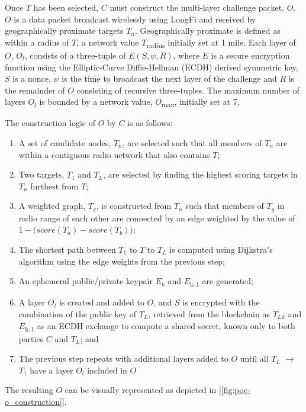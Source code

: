 \documentclass[10pt, nonatbib, nocopyrightspace, reprint]{sigplanconf}
\newcommand{\figref}[1]{[\autoref{#1}]}
\begin{document}
Once $T$ has been selected, $C$ must construct the multi-layer challenge packet, $O$. $O$ is a data packet broadcast wirelessly using LongFi and received by geographically proximate targets $T_n$. Geographically proximate is defined as within a radius of $T$, a network value $T$\textsubscript{radius} initially set at 1 mile. Each layer of $O$, $O_l$, consists of a three-tuple of $E\left(S, \psi, R\right)$, where $E$ is a secure encryption function using the Elliptic-Curve Diffie-Hellman (ECDH) derived symmetric key, $S$ is a nonce, $\psi$ is the time to broadcast the next layer of the challenge and $R$ is the remainder of $O$ consisting of recursive three-tuples. The maximum number of layers $O_l$ is bounded by a network value, $O$\textsubscript{max}, initially set at 7.

The construction logic of $O$ by $C$ is as follows:

\begin{enumerate}
  \item A set of candidate nodes, $T_n$, are selected such that all members of $T_n$ are within a contiguous radio network that also contains $T$;
  \item Two targets, $T_1$ and $T_L$, are selected by finding the highest scoring targets in $T_n$ furthest from $T$;
  \item A weighted graph, $T_g$, is constructed from $T_n$ such that members of $T_g$ in radio range of each other are connected by an edge weighted by the value of \(1 - \Big({score(T_a) - score(T_b)}\Big)\);
  \item The shortest path between $T_1$ to $T$ to $T_L$ is computed using Dijkstra's algorithm\cite{dijkstra} using the edge weights from the previous step;
  \item An ephemeral public/private keypair $E_k$ and $E$\textsubscript{k-1} are generated;
  \item A layer $O_l$ is created and added to $O$, and $S$ is encrypted with the combination of the public key of $T_L$, retrieved from the blockchain as $T_L$$_k$ and $E$\textsubscript{k-1} as an ECDH exchange to compute a shared secret, known only to both parties $C$ and $T_L$; and
  \item The previous step repeats with additional layers added to $O$ until all $T_L$ $\rightarrow$ $T_1$ have a layer $O_l$ included in $O$
\end{enumerate}

The resulting $O$ can be visually represented as depicted in \figref{fig:poc-o_construction}.
\end{document}
